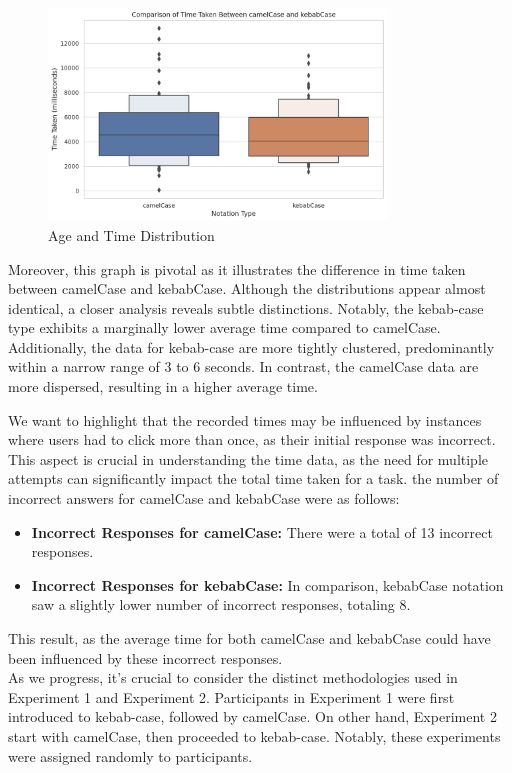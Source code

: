 \documentclass{article}
\begin{document}
\begin{figure}[H]
    \centering
    \includegraphics[width=0.8\textwidth]{difference_type.png}
    \caption{Age and Time Distribution}
\end{figure}

Moreover, this graph is pivotal as it illustrates the difference in time taken between camelCase and kebabCase. Although the distributions appear almost identical, a closer analysis reveals subtle distinctions. Notably, the kebab-case type exhibits a marginally lower average time compared to camelCase. Additionally, the data for kebab-case are more tightly clustered, predominantly within a narrow range of 3 to 6 seconds. In contrast, the camelCase data are more dispersed, resulting in a higher average time.

We want to highlight that the recorded times may be influenced by instances where users had to click more than once, as their initial response was incorrect. This aspect is crucial in understanding the time data, as the need for multiple attempts can significantly impact the total time taken for a task. the number of incorrect answers for camelCase and kebabCase were as follows:

\begin{itemize}
    \item \textbf{Incorrect Responses for camelCase:} There were a total of 13 incorrect responses.
    \item \textbf{Incorrect Responses for kebabCase:} In comparison, kebabCase notation saw a slightly lower number of incorrect responses, totaling 8.
\end{itemize}

This result, as the average time for both camelCase and kebabCase could have been influenced by these incorrect responses.\\


As we progress, it's crucial to consider the distinct methodologies used in Experiment 1 and Experiment 2. Participants in Experiment 1 were first introduced to kebab-case, followed by camelCase. On other hand, Experiment 2 start with camelCase, then proceeded to kebab-case. Notably, these experiments were assigned randomly to participants.
\end{document}
